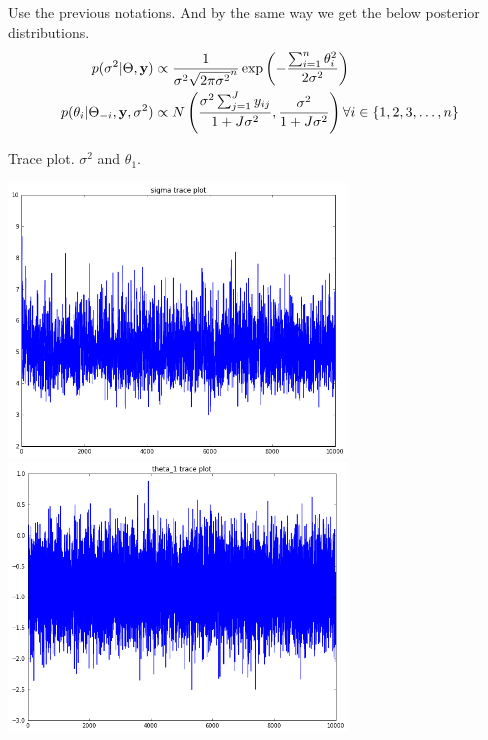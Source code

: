 \documentclass{article}
\begin{document}
	\subsection{}
	Use the previous notations. And by the same way we get the below posterior distributions.
		\begin{align*}
			p(\sigma^2 | \Theta, {\bf y}) &\propto \frac{1}{\sigma^2 \sqrt{2\pi\sigma^2}^n} \exp \left( -\frac{\sum_{i=1}^{n} \theta_{i}^{2}}{2\sigma^2}\right)\\
			p(\theta_i | \Theta_{-i}, {\bf y}, \sigma^2) &\propto N\left( \frac{\sigma^2 \sum_{j=1}^{J} y_{ij}}{1 + J\sigma^2}, \frac{\sigma^2}{1 + J\sigma^2}\right) \forall i \in \left\{ 1,2,3, \dots, n \right\} \\
		\end{align*}
		
		\par
		Trace plot. $\sigma^2$ and $\theta_1$.
		\par
		\includegraphics[width = 9cm]{2-d-sigma.png}
		\includegraphics[width = 9cm]{2-d-theta.png}

\section{}
\end{document}
